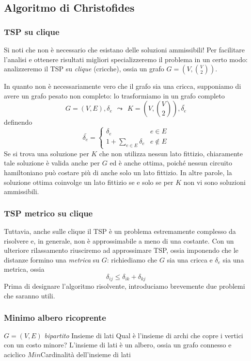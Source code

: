 \subsection{Algoritmo di Christofides}
\subsubsection{TSP su clique}
Si noti che non è necessario che esistano delle soluzioni ammissibili!
Per facilitare l'analisi e ottenere risultati migliori specializzeremo il problema in un certo modo:
analizzeremo il TSP su \textit{clique} (cricche), ossia un grafo
$G = (V, {V \choose{2}})$.

In quanto non è necessariamente vero che il grafo sia una cricca,
supponiamo di avere un grafo pesato non completo: lo trasformiamo in un
grafo completo
$$
	G = (V, E), \delta_e ~~ \leadsto ~~ K = (V, {V \choose 2}), \bar{\delta_e}
$$
definendo
$$
	\bar{\delta_e} =
	\begin{cases}
		\delta_e                    & e \in E    \\
		1 + \sum_{e \in E} \delta_e & e \notin E
	\end{cases}
$$
Se si trova una soluzione per $K$ che non utilizza nessun lato fittizio,
chiaramente tale soluzione è valida anche per $G$ ed è anche ottima, poiché
nessun circuito hamiltoniano può costare più di anche solo un lato fittizio.
In altre parole, la soluzione ottima coinvolge un lato fittizio se e solo se
per $K$ non vi sono soluzioni ammissibili.

\subsubsection{TSP metrico su clique}
Tuttavia, anche sulle clique il TSP è un problema estremamente complesso da
risolvere e, in generale, non è approssimabile a meno di una costante.
Con un ulteriore rilassamento riusciremo ad approssimare TSP, ossia
imponendo che le distanze formino una \textit{metrica} su $G$:
richiediamo che $G$ sia una cricca e $\delta_e$ sia una metrica, ossia $$
	\delta_{ij} \leq \delta_{ik} + \delta_{kj}
$$
Prima di designare l'algoritmo risolvente, introduciamo brevemente due problemi che
saranno utili.
\subsubsection{Minimo albero ricoprente}
 {$G = (V,E)$ \textit{bipartito}} {Insieme di lati}
{Qual è l'insieme di archi che copre i vertici con un costo minore?}
{L'insieme di lati è un albero, ossia un grafo connesso e aciclico}
{$Min$}{Cardinalità dell'insieme di lati}


